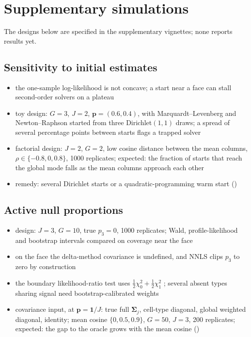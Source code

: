 \section{Supplementary simulations}
\label{app:supp-sim}

The designs below are specified in the supplementary vignettes; none reports results yet.

\subsection{Sensitivity to initial estimates}
\label{app:sim-init}

\begin{itemize}
  \item the one-sample log-likelihood is not concave; a start near a face can stall second-order solvers on a plateau
  \item toy design: \(G=3\), \(J=2\), \(\boldsymbol{p}=(0.6,0.4)\), with Marquardt--Levenberg and Newton--Raphson started
        from three Dirichlet\((1,1)\) draws; a spread of several percentage points between starts flags a trapped solver
  \item factorial design: \(J=2\), \(G=2\), low cosine distance between the mean columns,
        \(\rho\in\{-0.8,0,0.8\}\), 1000 replicates; expected: the fraction of starts that reach the global mode falls as
        the mean columns approach each other
  \item remedy: several Dirichlet starts or a quadratic-programming warm start
        ()
\end{itemize}

\subsection{Active null proportions}
\label{app:sim-boundary}

\begin{itemize}
  \item design: \(J=3\), \(G=10\), true \(p_{3}=0\), 1000 replicates; Wald, profile-likelihood and bootstrap intervals
        compared on coverage near the face
  \item on the face the delta-method covariance is undefined, and NNLS clips \(p_{3}\) to zero by construction
  \item the boundary likelihood-ratio test uses \(\tfrac12\chi^{2}_{0}+\tfrac12\chi^{2}_{1}\)
        \cite{hermanDistributionLikelihoodRatio1954,selfAsymptoticPropertiesMaximum1987}; several absent types sharing
        signal need bootstrap-calibrated weights
  \item covariance input, at \(\boldsymbol{p}=\mathbf{1}/J\): true full \(\boldsymbol{\Sigma}_{j}\), cell-type diagonal, global weighted
        diagonal, identity; mean cosine \(\{0,0.5,0.9\}\), \(G=50\), \(J=3\), 200 replicates; expected: the gap to the
        oracle grows with the mean cosine ()
\end{itemize}

